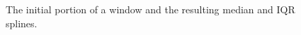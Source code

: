\documentclass[a4paper,11pt]{article}
\begin{document}
\begin{figure}[H]
{		\label{fig:Spline_Median}
	}
	\caption{\footnotesize The initial portion of a window and the resulting median and IQR splines.}
	\label{fig:splines}
\end{figure}
\end{document}
